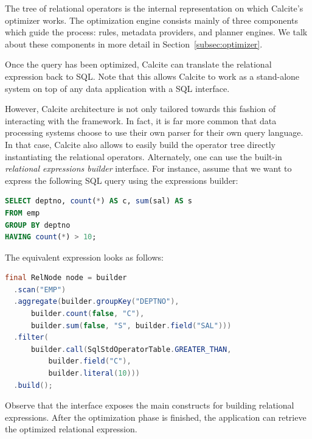 The tree of relational operators is the internal representation on which Calcite's optimizer works. The optimization engine consists mainly of three components which guide the process: rules, metadata providers, and planner engines. We talk about these components in more detail in Section~\ref{subsec:optimizer}.

Once the query has been optimized, Calcite can translate the relational expression back to SQL. Note that this allows Calcite to work as a stand-alone system on top of any data application with a SQL interface.

However, Calcite architecture is not only tailored towards this fashion of interacting with the framework. In fact, it is far more common that data processing systems choose to use their own parser for their own query language. In that case, Calcite also allows to easily build the operator tree directly instantiating the relational operators. Alternately, one can use the built-in \textit{relational expressions builder} interface. For instance, assume that we want to express the following SQL query using the expressions builder:

\begin{lstlisting}[language=SQL]
SELECT deptno, count(*) AS c, sum(sal) AS s
FROM emp
GROUP BY deptno
HAVING count(*) > 10;
\end{lstlisting}

The equivalent expression looks as follows:

\begin{lstlisting}[language=Java]
final RelNode node = builder
  .scan("EMP")
  .aggregate(builder.groupKey("DEPTNO"),
      builder.count(false, "C"),
      builder.sum(false, "S", builder.field("SAL")))
  .filter(
      builder.call(SqlStdOperatorTable.GREATER_THAN,
          builder.field("C"),
          builder.literal(10)))
  .build();
\end{lstlisting}

Observe that the interface exposes the main constructs for building relational expressions. After the optimization phase is finished, the application can retrieve the optimized relational expression.











